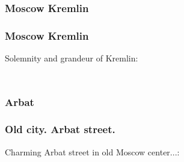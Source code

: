 \documentclass[pdflatex,compress,8pt,
	xcolor={dvipsnames,dvipsnames,svgnames,x11names,table},
	hyperref={colorlinks = true,breaklinks = true, urlcolor = NavyBlue, breaklinks = true}]{beamer}
\begin{document}
\subsubsection{Moscow Kremlin}
\begin{frame}\frametitle{Moscow Kremlin}
Solemnity and grandeur of Kremlin: 
\begin{minipage}[0.4\textheight]{\textwidth}
\begin{columns}[T]
\begin{column}{0.5\textwidth}
\begin{figure}[H]
	\centering
			\vspace{2mm}
\end{figure}
\end{column}
\begin{column}{0.5\textwidth}
\begin{figure}[H]
	\centering
			\vspace{2mm}
\end{figure}
\end{column}
\end{columns}
\end{minipage}
\end{frame}

\subsubsection{Arbat}
\begin{frame}\frametitle{Old city. Arbat street.}
Charming Arbat street in old Moscow center...:
\begin{minipage}[0.4\textheight]{\textwidth}
\begin{columns}[T]
\begin{column}{0.4\textwidth}
\begin{figure}[H]
	\centering
			\vspace{2mm}
\end{figure}
\end{column}
\begin{column}{0.6\textwidth}
\begin{figure}[H]
	\centering
			\vspace{2mm}
\end{figure}
\end{column}
\end{columns}
\end{minipage}
\end{frame}
\end{document}
